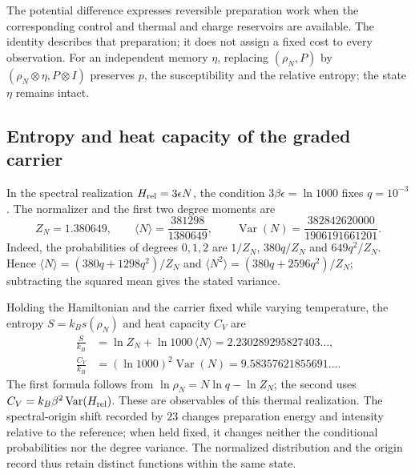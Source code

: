 The potential difference expresses reversible preparation work when the
corresponding control and thermal and charge reservoirs are available.
The identity describes that preparation; it does not assign a fixed cost
to every observation. For an independent memory $\eta$, replacing
$(\rho_N,P)$ by $(\rho_N\otimes\eta,P\otimes I)$ preserves $p$, the
susceptibility and the relative entropy; the state $\eta$ remains intact.

\subsection{Entropy and heat capacity of the graded carrier}
\label{sec:termica-ejemplo-calorifico-recuperado}

In the spectral realization $H_{\rm rel}=3\epsilon N$, the condition
$3\beta\epsilon=\ln1000$ fixes $q=10^{-3}$. The normalizer and the first
two degree moments are
\[
 Z_N=1.380649,\qquad
 \langle N\rangle=\frac{381298}{1380649},\qquad
 \operatorname{Var}(N)=\frac{382842620000}{1906191661201}.
\]
Indeed, the probabilities of degrees $0,1,2$ are $1/Z_N$, $380q/Z_N$ and
$649q^2/Z_N$. Hence $\langle N\rangle=(380q+1298q^2)/Z_N$ and
$\langle N^2\rangle=(380q+2596q^2)/Z_N$; subtracting the squared mean
gives the stated variance.

Holding the Hamiltonian and the carrier fixed while varying temperature,
the entropy $S=k_Bs(\rho_N)$ and heat capacity $C_V$ are
\begin{align*}
 \frac{S}{k_B}
 &=\ln Z_N+\ln1000\,\langle N\rangle
   =2.230289295827403\ldots,\\
 \frac{C_V}{k_B}
 &=(\ln1000)^2\operatorname{Var}(N)
   =9.58357621855691\ldots.
\end{align*}
The first formula follows from $\ln\rho_N=N\ln q-\ln Z_N$; the second
uses $C_V=k_B\beta^2\operatorname{Var}(H_{\rm rel})$.
These are observables of this thermal realization. The spectral-origin
shift recorded by $23$ changes preparation energy and intensity relative
to the reference; when held fixed, it changes neither the conditional
probabilities nor the degree variance. The normalized distribution and
the origin record thus retain distinct functions within the same state.
